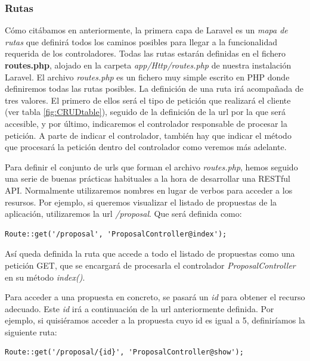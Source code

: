\subsubsection{Rutas}

Cómo citábamos en anteriormente, la primera capa de Laravel es un \textit{mapa de rutas} que definirá todos los caminos posibles para llegar a la funcionalidad requerida de los controladores. Todas las rutas estarán definidas en el fichero \textbf{routes.php}, alojado en la carpeta \textit{app/Http/routes.php} de nuestra instalación Laravel. El archivo \textit{routes.php} es un fichero muy simple escrito en PHP donde definiremos todas las rutas posibles. La definición de una ruta irá acompañada de tres valores. El primero de ellos será el tipo de petición que realizará el cliente (ver tabla \ref{fig:CRUDtable}), seguido de la definición de la url por la que será accesible, y por último, indicaremos el controlador responsable de procesar la petición. A parte de indicar el controlador, también hay que indicar el método que procesará la petición dentro del controlador como veremos más adelante.

Para definir el conjunto de urls que forman el archivo \textit{routes.php}, hemos seguido una serie de buenas prácticas \cite{ref:practicesRESTful_API} habituales a la hora de desarrollar una RESTful API. Normalmente utilizaremos nombres en lugar de verbos para acceder a los resursos. Por ejemplo, si queremos visualizar el listado de propuestas de la aplicación, utilizaremos la url \textit{/proposal}. Que será definida como:	

\lstset{
   language        = php}
\begin{lstlisting}[frame=single]	
Route::get('/proposal', 'ProposalController@index');
\end{lstlisting}

Así queda definida la ruta que accede a todo el listado de propuestas como una petición GET, que se encargará de procesarla el controlador \textit{ProposalController} en su método \textit{index()}.

Para acceder a una propuesta en concreto, se pasará un \textit{id} para obtener el recurso adecuado. Este \textit{id} irá a continuación de la url anteriormente definida. Por ejemplo, si quisiéramos acceder a la propuesta cuyo id es igual a 5, definiríamos la siguiente ruta:

\lstset{
  language        = php}
  \begin{lstlisting}[frame=single]	
Route::get('/proposal/{id}', 'ProposalController@show');
\end{lstlisting}

